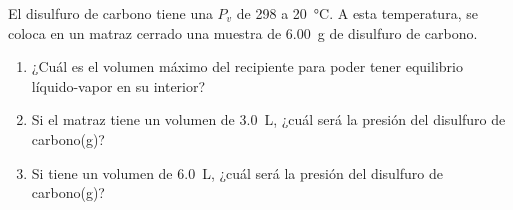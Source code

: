 El disulfuro de carbono tiene una $P_v$ de \SI{298}{\torr} a \SI{20}{\celsius}. A esta temperatura, se coloca en un matraz cerrado una muestra de \SI{6,00}{\gram} de disulfuro de carbono.
\begin{enumerate}[label={\alph*)},font={\color{red!50!black}\bfseries}]
	\item ¿Cuál es el volumen máximo del recipiente para poder tener equilibrio líquido-vapor en su interior?
	\item Si el matraz tiene un volumen de \SI{3,0}{\liter}, ¿cuál será la presión del disulfuro de carbono(g)?
	\item Si tiene un volumen de \SI{6,0}{\liter}, ¿cuál será la presión del disulfuro de carbono(g)?
\end{enumerate}
